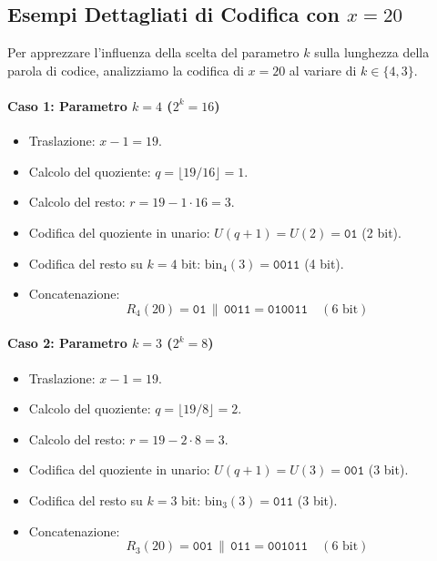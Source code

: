 \FloatBarrier
\subsection{Esempi Dettagliati di Codifica con $x = 20$}
\label{subsec:esempi-rice-20}

Per apprezzare l'influenza della scelta del parametro $k$ sulla lunghezza della parola di codice, analizziamo la codifica di $x = 20$ al variare di $k \in \{4, 3\}$.

\paragraph{Caso 1: Parametro $k = 4$ ($2^k = 16$)}
\begin{itemize}
  \item Traslazione: $x - 1 = 19$.
  \item Calcolo del quoziente: $q = \lfloor 19 / 16 \rfloor = 1$.
  \item Calcolo del resto: $r = 19 - 1 \cdot 16 = 3$.
  \item Codifica del quoziente in unario: $U(q + 1) = U(2) = \texttt{01}$ (2 bit).
  \item Codifica del resto su $k = 4$ bit: $\text{bin}_4(3) = \texttt{0011}$ (4 bit).
  \item Concatenazione:
  \begin{equation}
    R_4(20) = \texttt{01} \,\|\, \texttt{0011} = \texttt{010011} \quad (6 \text{ bit})
  \end{equation}
\end{itemize}

\paragraph{Caso 2: Parametro $k = 3$ ($2^k = 8$)}
\begin{itemize}
  \item Traslazione: $x - 1 = 19$.
  \item Calcolo del quoziente: $q = \lfloor 19 / 8 \rfloor = 2$.
  \item Calcolo del resto: $r = 19 - 2 \cdot 8 = 3$.
  \item Codifica del quoziente in unario: $U(q + 1) = U(3) = \texttt{001}$ (3 bit).
  \item Codifica del resto su $k = 3$ bit: $\text{bin}_3(3) = \texttt{011}$ (3 bit).
  \item Concatenazione:
  \begin{equation}
    R_3(20) = \texttt{001} \,\|\, \texttt{011} = \texttt{001011} \quad (6 \text{ bit})
  \end{equation}
\end{itemize}


